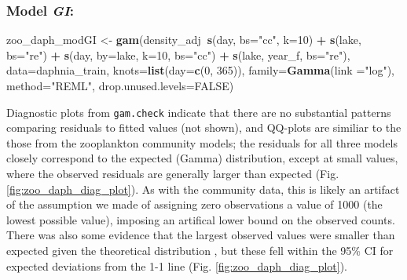 \documentclass[12pt]{article}
\newenvironment{Shaded}{\begin{snugshade}}{\end{snugshade}}
\newcommand{\KeywordTok}[1]{\textcolor[rgb]{0.13,0.29,0.53}{\textbf{#1}}}
\newcommand{\DataTypeTok}[1]{\textcolor[rgb]{0.13,0.29,0.53}{#1}}
\newcommand{\DecValTok}[1]{\textcolor[rgb]{0.00,0.00,0.81}{#1}}
\newcommand{\StringTok}[1]{\textcolor[rgb]{0.31,0.60,0.02}{#1}}
\newcommand{\OtherTok}[1]{\textcolor[rgb]{0.56,0.35,0.01}{#1}}
\newcommand{\OperatorTok}[1]{\textcolor[rgb]{0.81,0.36,0.00}{\textbf{#1}}}
\newcommand{\NormalTok}[1]{#1}
\begin{document}
\subsubsection{\texorpdfstring{Model
\emph{GI}:}{Model GI:}}\label{model-gi}

\begin{Shaded}
\begin{Highlighting}[]
\NormalTok{zoo_daph_modGI <-}\StringTok{ }\KeywordTok{gam}\NormalTok{(density_adj}\OperatorTok{~}\KeywordTok{s}\NormalTok{(day, }\DataTypeTok{bs=}\StringTok{"cc"}\NormalTok{, }\DataTypeTok{k=}\DecValTok{10}\NormalTok{) }\OperatorTok{+}\StringTok{ }\KeywordTok{s}\NormalTok{(lake, }\DataTypeTok{bs=}\StringTok{"re"}\NormalTok{) }\OperatorTok{+}
\StringTok{                        }\KeywordTok{s}\NormalTok{(day, }\DataTypeTok{by=}\NormalTok{lake, }\DataTypeTok{k=}\DecValTok{10}\NormalTok{, }\DataTypeTok{bs=}\StringTok{"cc"}\NormalTok{) }\OperatorTok{+}\StringTok{ }\KeywordTok{s}\NormalTok{(lake, year_f, }\DataTypeTok{bs=}\StringTok{"re"}\NormalTok{),}
                      \DataTypeTok{data=}\NormalTok{daphnia_train, }\DataTypeTok{knots=}\KeywordTok{list}\NormalTok{(}\DataTypeTok{day=}\KeywordTok{c}\NormalTok{(}\DecValTok{0}\NormalTok{, }\DecValTok{365}\NormalTok{)),}
                      \DataTypeTok{family=}\KeywordTok{Gamma}\NormalTok{(}\DataTypeTok{link =}\StringTok{"log"}\NormalTok{), }\DataTypeTok{method=}\StringTok{"REML"}\NormalTok{,}
                      \DataTypeTok{drop.unused.levels=}\OtherTok{FALSE}\NormalTok{)}
\end{Highlighting}
\end{Shaded}

Diagnostic plots from \texttt{gam.check} indicate that there are no
substantial patterns comparing residuals to fitted values (not shown),
and QQ-plots are similiar to the those from the zooplankton community
models; the residuals for all three models closely correspond to the
expected (Gamma) distribution, except at small values, where the
observed residuals are generally larger than expected (Fig.
\ref{fig:zoo_daph_diag_plot}). As with the community data, this is
likely an artifact of the assumption we made of assigning zero
observations a value of 1000 (the lowest possible value), imposing an
artifical lower bound on the observed counts. There was also some
evidence that the largest observed values were smaller than expected
given the theoretical distribution , but these fell within the 95\% CI
for expected deviations from the 1-1 line (Fig.
\ref{fig:zoo_daph_diag_plot}).
\end{document}
